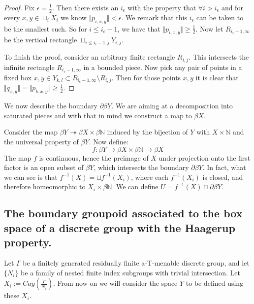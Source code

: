 \begin{example}
\begin{proof}
Fix $\epsilon = \frac{1}{2}$. Then there exists an $i_{\epsilon}$ with the property that $\forall i>i_{\epsilon}$ and for every $x,y \in \sqcup_{i}X_{i}$ we know $\Vert p_{i,x,y} \Vert < \epsilon$. We remark that this $i_{\epsilon}$ can be taken to be the smallest such. So for $i \leq i_{\epsilon}-1$, we have that $\Vert p_{i,x,y} \Vert \geq \frac{1}{2}$. Now let $R_{i_{\epsilon}-1,\infty}$ be the vertical rectangle $\sqcup_{i\leq i_{\epsilon}-1,j} Y_{i,j}$. 

To finish the proof, consider an arbitrary finite rectangle $R_{i,j}$. This intersects the infinite rectangle $R_{i_{\epsilon}-1,\infty}$ in a bounded piece. Now pick any pair of points in a fixed box $x,y \in Y_{k,l} \subset R_{i_{\epsilon}-1,\infty} \setminus R_{i,j}$. Then for those points $x,y$ it is clear that $\Vert q_{x,y} \Vert = \Vert p_{k,x,y}\Vert \geq \frac{1}{2}$.
\end{proof}

We now describe the boundary $\partial\beta Y$. We are aiming at a decomposition into saturated pieces and with that in mind we construct a map to $\beta X$.

Consider the map $\beta Y \twoheadrightarrow \beta X \times \beta \mathbb{N}$ induced by the bijection of $Y$ with $X \times \mathbb{N}$ and the universal property of $\beta Y$. Now define:
\begin{equation*}
f: \beta Y \rightarrow \beta X \times \beta \mathbb{N} \rightarrow \beta X
\end{equation*}
The map $f$ is continuous, hence the preimage of $X$ under projection onto the first factor is an open subset of $\beta Y$, which intersects the boundary $\partial \beta Y$. In fact, what we can see is that $f^{-1}(X)= \sqcup f^{-1}(X_{i})$, where each $f^{-1}(X_{i})$ is closed, and therefore homeomorphic to $X_{i} \times \beta \mathbb{N}$. We can define $U = f^{-1}(X)\cap \partial\beta Y$.

\subsection{The boundary groupoid associated to the box space of a discrete group with the Haagerup property.}

Let $\Gamma$ be a finitely generated residually finite a-T-menable discrete group, and let $\lbrace N_{i}\rbrace$ be a family of nested finite index subgroups with trivial intersection. Let $X_{i}:=Cay(\frac{\Gamma}{N_{i}})$. From now on we will consider the space $Y$ to be defined using these $X_{i}$. 


\end{example}

